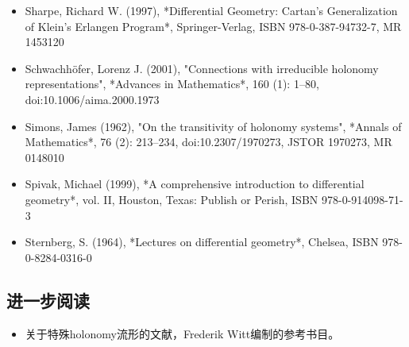 \begin{itemize}
\item Sharpe, Richard W. (1997), *Differential Geometry: Cartan's Generalization of Klein's Erlangen Program*, Springer-Verlag, ISBN 978-0-387-94732-7, MR 1453120  
\item Schwachhöfer, Lorenz J. (2001), "Connections with irreducible holonomy representations", *Advances in Mathematics*, 160 (1): 1–80, doi:10.1006/aima.2000.1973  
\item Simons, James (1962), "On the transitivity of holonomy systems", *Annals of Mathematics*, 76 (2): 213–234, doi:10.2307/1970273, JSTOR 1970273, MR 0148010  
\item Spivak, Michael (1999), *A comprehensive introduction to differential geometry*, vol. II, Houston, Texas: Publish or Perish, ISBN 978-0-914098-71-3  
\item Sternberg, S. (1964), *Lectures on differential geometry*, Chelsea, ISBN 978-0-8284-0316-0  
\end{itemize}
\subsection{进一步阅读}
\begin{itemize}
\item 关于特殊holonomy流形的文献，Frederik Witt编制的参考书目。
\end{itemize}